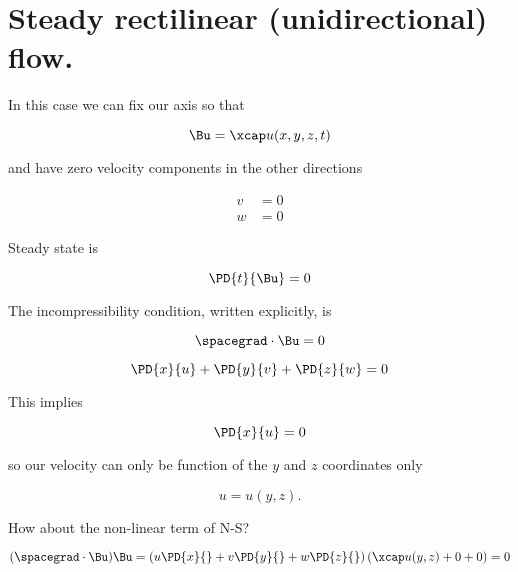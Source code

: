 \section{Steady rectilinear (unidirectional) flow.}

In this case we can fix our axis so that

\begin{equation}\label{eqn:continuumL11:170}
\Bu = \xcap u(x, y, z, t) 
\end{equation}

and have zero velocity components in the other directions

\begin{align}\label{eqn:continuumL11:190}
v &= 0 \\
w &= 0
\end{align}

Steady state is 

\begin{equation}\label{eqn:continuumL11:210}
\PD{t}{\Bu} = 0
\end{equation}

The incompressibility condition, written explicitly, is

\begin{equation}\label{eqn:continuumL11:230}
\spacegrad \cdot \Bu = 0
\end{equation}

\begin{equation}\label{eqn:continuumL11:250}
\PD{x}{u} + \PD{y}{v} + \PD{z}{w} = 0
\end{equation}

This implies 

\begin{equation}\label{eqn:continuumL11:270}
\PD{x}{u} = 0
\end{equation}

so our velocity can only be function of the $y$ and $z$ coordinates only

\begin{equation}\label{eqn:continuumL11:290}
u = u(y, z).
\end{equation}

How about the non-linear term of N-S?

\begin{equation}\label{eqn:continuumL11:510}
(\spacegrad \cdot \Bu) \Bu
=
\left(u \PD{x}{}
+v \PD{y}{}
+w \PD{z}{} \right) (\xcap u( y, z) + 0 + 0 )
= 0
\end{equation}

